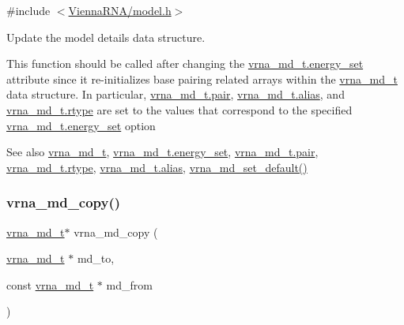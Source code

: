 {\ttfamily \#include $<$\mbox{\hyperlink{model_8h}{Vienna\+R\+N\+A/model.\+h}}$>$}



Update the model details data structure. 

This function should be called after changing the \mbox{\hyperlink{group__model__details_a5eee4e3b468eb690d1407e0178dafb3f}{vrna\+\_\+md\+\_\+t.\+energy\+\_\+set}} attribute since it re-\/initializes base pairing related arrays within the \mbox{\hyperlink{group__model__details_ga1f8a10e12a0a1915f2a4eff0b28ea17c}{vrna\+\_\+md\+\_\+t}} data structure. In particular, \mbox{\hyperlink{group__model__details_ab4da594c638707e212f64aadb54a7454}{vrna\+\_\+md\+\_\+t.\+pair}}, \mbox{\hyperlink{group__model__details_a66136cf9abc8ff790ec0d33245d68fd5}{vrna\+\_\+md\+\_\+t.\+alias}}, and \mbox{\hyperlink{group__model__details_ad082d0fea31e002b90cdfe5e6382f8b0}{vrna\+\_\+md\+\_\+t.\+rtype}} are set to the values that correspond to the specified \mbox{\hyperlink{group__model__details_a5eee4e3b468eb690d1407e0178dafb3f}{vrna\+\_\+md\+\_\+t.\+energy\+\_\+set}} option

\begin{DoxySeeAlso}{See also}
\mbox{\hyperlink{group__model__details_ga1f8a10e12a0a1915f2a4eff0b28ea17c}{vrna\+\_\+md\+\_\+t}}, \mbox{\hyperlink{group__model__details_a5eee4e3b468eb690d1407e0178dafb3f}{vrna\+\_\+md\+\_\+t.\+energy\+\_\+set}}, \mbox{\hyperlink{group__model__details_ab4da594c638707e212f64aadb54a7454}{vrna\+\_\+md\+\_\+t.\+pair}}, \mbox{\hyperlink{group__model__details_ad082d0fea31e002b90cdfe5e6382f8b0}{vrna\+\_\+md\+\_\+t.\+rtype}}, \mbox{\hyperlink{group__model__details_a66136cf9abc8ff790ec0d33245d68fd5}{vrna\+\_\+md\+\_\+t.\+alias}}, \mbox{\hyperlink{group__model__details_ga8ac6ff84936282436f822644bf841f66}{vrna\+\_\+md\+\_\+set\+\_\+default()}} 
\end{DoxySeeAlso}
\mbox{\label{group__model__details_ga619057a740918b5fb01808362bb67aea}} 
\subsubsection{\texorpdfstring{vrna\_md\_copy()}{vrna\_md\_copy()}}
{\footnotesize\ttfamily \mbox{\hyperlink{group__model__details_ga1f8a10e12a0a1915f2a4eff0b28ea17c}{vrna\+\_\+md\+\_\+t}}$\ast$ vrna\+\_\+md\+\_\+copy (\begin{DoxyParamCaption}\item[{\mbox{\hyperlink{group__model__details_ga1f8a10e12a0a1915f2a4eff0b28ea17c}{vrna\+\_\+md\+\_\+t}} $\ast$}]{md\+\_\+to,  }\item[{const \mbox{\hyperlink{group__model__details_ga1f8a10e12a0a1915f2a4eff0b28ea17c}{vrna\+\_\+md\+\_\+t}} $\ast$}]{md\+\_\+from }\end{DoxyParamCaption})}



